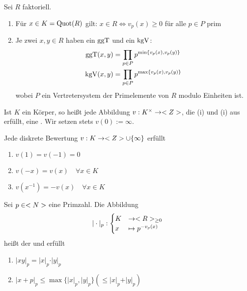 \begin{remark}
	Sei $R$ faktoriell.
	\begin{enumerate} %
		\item Für $x \in K = \operatorname{Quot}(R)$ gilt: $x \in R \Leftrightarrow v_p(x) \ge 0$ für alle $p \in P$ prim
		\item Je zwei $x,y \in R$ haben ein $\operatorname{ggT}$ und ein $\operatorname{kgV}$:
		\begin{align}
		\operatorname{ggT}(x,y) &= \prod_{p\in P} p^{\min\{v_p(x), v_p(y)\}} \notag \\
		\operatorname{kgV}(x,y) &= \prod_{p\in P} p^{\max\{v_p(x), v_p(y)\}} \notag
		\end{align}
		wobei $P$ ein Vertretersystem der Primelemente von $R$ modulo Einheiten ist. 
	\end{enumerate}
\end{remark}

\begin{definition}
	Ist $K$ ein Körper, so heißt jede Abbildung $v: K^{\times} \to <Z>$, die (i) und (i) aus  erfüllt, eine . Wir setzen stets $v(0) := \infty$.
\end{definition}

\begin{remark}
	Jede diskrete Bewertung $v: K \to <Z> \cup \{\infty\}$ erfüllt
	\begin{enumerate}
		\item $v(1) = v(-1) = 0$
		\item $v(-x) = v(x) \quad \forall x \in K$
		\item $v(x^{-1}) = -v(x) \quad \forall x \in K$
	\end{enumerate}
\end{remark}

\begin{definition}
	Sei $p \in <N>$ eine Primzahl. Die Abbildung
	\begin{align}
	\vert \cdot \vert_p: \begin{cases}
	K &\to \real_{\ge 0} \\ %
	x &\mapsto p^{-v_p(x)} \notag
	\end{cases}
	\end{align}
	heißt der  und erfüllt
	\begin{enumerate} %
		\item $\vert xy\vert_p = \vert x \vert_p \cdot \vert y\vert_p$
		\item $\vert x+p\vert_p \le \max\{\vert x\vert_p, \vert y\vert_p\} (\le \vert x\vert_p + \vert y\vert_p)$
	\end{enumerate}
\end{definition}